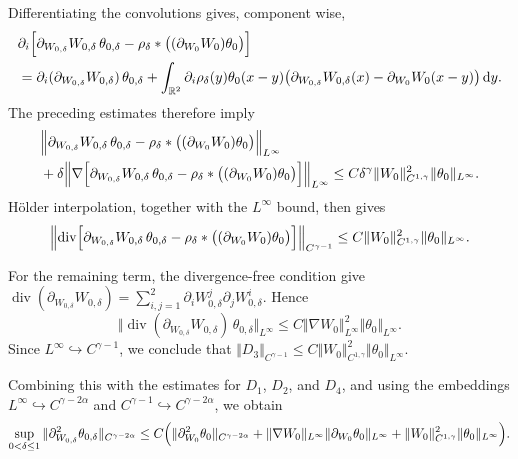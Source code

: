 \documentclass[reqno,11pt,a4paper]{amsart}
\newcommand{\dd}{\mathrm{d}}
\begin{document}
Differentiating the convolutions gives, component wise,
\begin{align*}
  &\partial_i\Bigl[
    \partial_{W_{0,\delta}}W_{0,\delta}\,
      \theta_{0,\delta}
    -
    \rho_\delta*
    \bigl((\partial_{W_0}W_0)\theta_0\bigr)
  \Bigr] \\
  & =
  \partial_i(\partial_{W_{0,\delta}}W_{0,\delta})
  \,\theta_{0,\delta}
  +
  \int_{\mathbb R^2}
  \partial_i\rho_\delta(y)\theta_0(x-y)
  \bigl(
    \partial_{W_{0,\delta}}W_{0,\delta}(x)
    -\partial_{W_0}W_0(x-y)
  \bigr)\,\dd y.
\end{align*}
The preceding estimates therefore imply
\begin{align*}
  &\Bigl\Vert 
    \partial_{W_{0,\delta}}W_{0,\delta}\,
      \theta_{0,\delta}
    -
    \rho_\delta*
    \bigl((\partial_{W_0}W_0)\theta_0\bigr)
  \Bigr\Vert _{L^\infty}
  \\
  &+
  \delta\Bigl\Vert 
    \nabla\Bigl[
      \partial_{W_{0,\delta}}W_{0,\delta}\,
        \theta_{0,\delta}
      -
      \rho_\delta*
      \bigl((\partial_{W_0}W_0)\theta_0\bigr)
    \Bigr]
  \Bigr\Vert _{L^\infty}
  \leq
  C\delta^\gamma
  \Vert W_0\Vert _{C^{1,\gamma}}^2
  \Vert \theta_0\Vert _{L^\infty}.
\end{align*}
H\"older interpolation, together with the
$L^\infty$ bound, then gives
\begin{align*}
  \Bigl\Vert 
    \operatorname{div}\Bigl[
      \partial_{W_{0,\delta}}W_{0,\delta}\,
        \theta_{0,\delta}
      -
      \rho_\delta*
      \bigl((\partial_{W_0}W_0)\theta_0\bigr)
    \Bigr]
  \Bigr\Vert _{C^{\gamma-1}}
  \leq
  C\Vert W_0\Vert _{C^{1,\gamma}}^2
  \Vert \theta_0\Vert _{L^\infty}.
\end{align*}

For the remaining term, the divergence-free condition give
$\operatorname{div}
  (\partial_{W_{0,\delta}}W_{0,\delta})
  =
  \sum_{i,j=1}^2
  \partial_iW_{0,\delta}^j
  \partial_jW_{0,\delta}^i$.
Hence
\[
  \bigl\Vert 
    \operatorname{div}
    (\partial_{W_{0,\delta}}W_{0,\delta})
    \,\theta_{0,\delta}
  \bigr\Vert _{L^\infty}
  \leq
  C\Vert \nabla W_0\Vert _{L^\infty}^2
  \Vert \theta_0\Vert _{L^\infty}.
\]
Since $L^\infty\hookrightarrow C^{\gamma-1}$,
we conclude that  $\Vert D_3\Vert _{C^{\gamma-1}}
  \leq
  C\Vert W_0\Vert _{C^{1,\gamma}}^2
  \Vert \theta_0\Vert _{L^\infty}$. 

Combining this with the estimates for $D_1$, $D_2$,
and $D_4$, and using the embeddings
$L^\infty\hookrightarrow C^{\gamma-2\alpha}$
and $C^{\gamma-1}\hookrightarrow C^{\gamma-2\alpha}$,
we obtain
\begin{align*}
  \sup_{0<\delta\leq1}
  \Vert \partial_{W_{0,\delta}}^2\theta_{0,\delta}
    \Vert _{C^{\gamma-2\alpha}}
  \leq
  C\Bigl(
    \Vert \partial_{W_0}^2\theta_0\Vert _{C^{\gamma-2\alpha}}
    +
    \Vert \nabla W_0\Vert _{L^\infty}
    \Vert \partial_{W_0}\theta_0\Vert _{L^\infty}
    +
    \Vert W_0\Vert _{C^{1,\gamma}}^2
    \Vert \theta_0\Vert _{L^\infty}
  \Bigr).
\end{align*}
\end{document}
